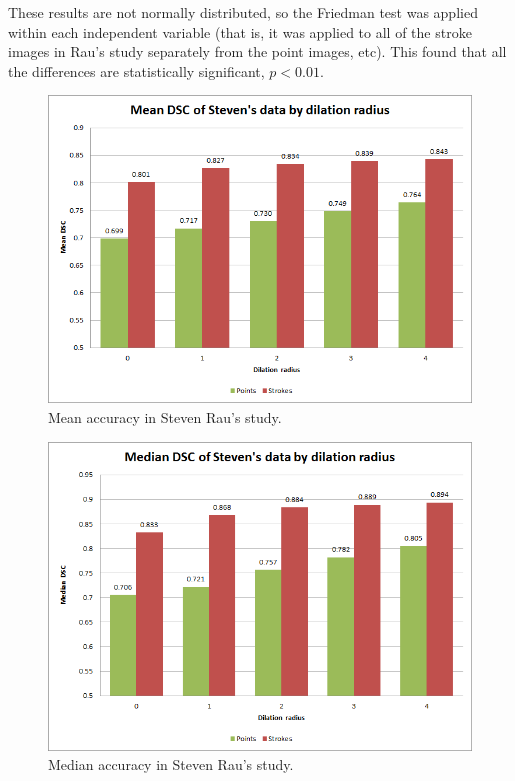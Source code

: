 \documentclass[12pt,a4paper,notitlepage]{article}
\begin{document}
These results are not normally distributed, so the Friedman test was applied within each independent variable (that is, it was applied to all of the stroke images in Rau's study separately from the point images, etc). This found that all the differences are statistically significant, $p < 0.01$.

\begin{figure}[H]
	\includegraphics[width=.9\linewidth]{steven_mean_dsc}
	\caption{Mean accuracy in Steven Rau's study.}
	\label{fig:steven_mean_dsc}
\end{figure}

\begin{figure}[H]
	\includegraphics[width=.9\linewidth]{steven_median_dsc}
	\caption{Median accuracy in Steven Rau's study.}
	\label{fig:steven_median_dsc}
\end{figure}
\end{document}
